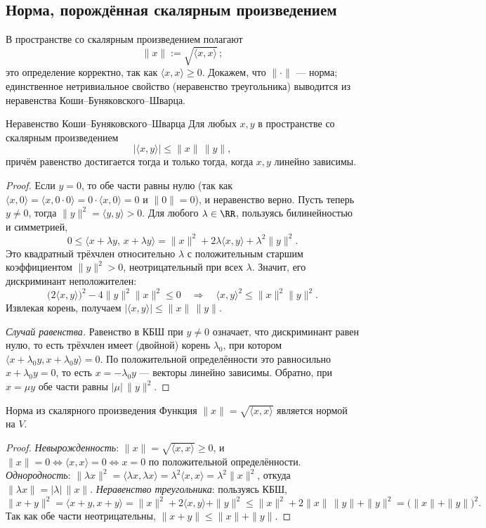 \subsection*{Норма, порождённая скалярным произведением}

В пространстве со скалярным произведением полагают
\[
\|x\|:=\sqrt{\langle x,x\rangle}\,;
\]
это определение корректно, так как $\langle x,x\rangle\ge0$. Докажем, что
$\|\cdot\|$ --- норма; единственное нетривиальное свойство (неравенство
треугольника) выводится из неравенства Коши--Буняковского--Шварца.

\begin{Theorem}{Неравенство Коши--Буняковского--Шварца}{}
	Для любых $x,y$ в пространстве со скалярным произведением
	\[
	|\langle x,y\rangle|\le\|x\|\,\|y\|,
	\]
	причём равенство достигается тогда и только тогда, когда $x,y$ линейно
	зависимы.
\end{Theorem}

\begin{proof}
	Если $y=0$, то обе части равны нулю (так как
	$\langle x,0\rangle=\langle x,0\cdot 0\rangle=0\cdot\langle x,0\rangle=0$ и
	$\|0\|=0$), и неравенство верно. Пусть теперь $y\ne0$, тогда
	$\|y\|^2=\langle y,y\rangle>0$. Для любого $\lambda\in\RR$, пользуясь
	билинейностью и симметрией,
	\[
	0\le\langle x+\lambda y,\,x+\lambda y\rangle
	=\|x\|^2+2\lambda\langle x,y\rangle+\lambda^2\|y\|^2.
	\]
	Это квадратный трёхчлен относительно $\lambda$ с положительным старшим
	коэффициентом $\|y\|^2>0$, неотрицательный при всех $\lambda$. Значит, его
	дискриминант неположителен:
	\[
	\bigl(2\langle x,y\rangle\bigr)^2-4\|y\|^2\|x\|^2\le0
	\quad\Longrightarrow\quad
	\langle x,y\rangle^2\le\|x\|^2\|y\|^2.
	\]
	Извлекая корень, получаем $|\langle x,y\rangle|\le\|x\|\,\|y\|$.

	\emph{Случай равенства.} Равенство в КБШ при $y\ne0$ означает, что
	дискриминант равен нулю, то есть трёхчлен имеет (двойной) корень
	$\lambda_0$, при котором $\langle x+\lambda_0 y,x+\lambda_0 y\rangle=0$. По
	положительной определённости это равносильно $x+\lambda_0 y=0$, то есть
	$x=-\lambda_0 y$ --- векторы линейно зависимы. Обратно, при $x=\mu y$
	обе части равны $|\mu|\,\|y\|^2$.
\end{proof}

\begin{Theorem}{Норма из скалярного произведения}{}
	Функция $\|x\|=\sqrt{\langle x,x\rangle}$ является нормой на $V$.
\end{Theorem}

\begin{proof}
	\emph{Невырожденность}: $\|x\|=\sqrt{\langle x,x\rangle}\ge0$, и $\|x\|=0
	\iff\langle x,x\rangle=0\iff x=0$ по положительной определённости.
	\emph{Однородность}:
	$\|\lambda x\|^2=\langle\lambda x,\lambda x\rangle=\lambda^2\langle x,x\rangle
	=\lambda^2\|x\|^2$, откуда $\|\lambda x\|=|\lambda|\,\|x\|$.
	\emph{Неравенство треугольника}: пользуясь КБШ,
	\[
	\|x+y\|^2=\langle x+y,x+y\rangle
	=\|x\|^2+2\langle x,y\rangle+\|y\|^2
	\le\|x\|^2+2\|x\|\,\|y\|+\|y\|^2
	=\bigl(\|x\|+\|y\|\bigr)^2.
	\]
	Так как обе части неотрицательны, $\|x+y\|\le\|x\|+\|y\|$.
\end{proof}

